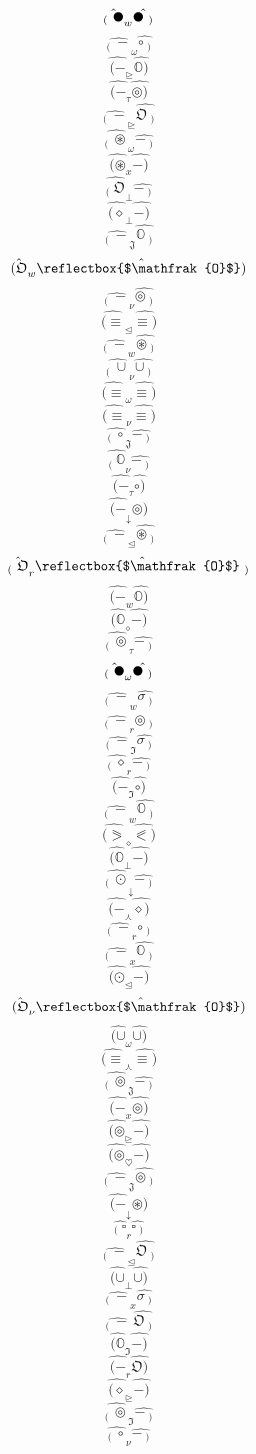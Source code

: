 \documentclass[12pt]{article}
\begin{document}
\begin{multicols}{5}
$$\hat{_( \ \newmoon} _w \hat{\newmoon\ _)}$$
$$\hat{_( \ -} _\omega \hat{\circ\ _)}$$
$$\hat{(-} _\trianglerighteq \hat{\mathbb{O})}$$
$$\hat{(-} _\tau \hat{\circledcirc)}$$
$$\hat{_( \ -} _\trianglerighteq \hat{\mathfrak{O}\ _)}$$
$$\hat{_( \ \circledast} _\omega \hat{-\ _)}$$
$$\hat{(\circledast} _x \hat{-)}$$
$$\hat{_( \ \mathfrak{O}} _\bot \hat{-\ _)}$$
$$\hat{(\diamond} _\bot \hat{-)}$$
$$\hat{_( \ -} _\mathfrak{J} \hat{\mathbb{O}\ _)}$$
$$\hat{(\mathfrak{O}} _w \hat{\reflectbox{$\mathfrak{O}$})}$$
$$\hat{_( \ -} _\nu \hat{\circledcirc\ _)}$$
$$\hat{(\equiv} _\trianglelefteq \hat{\equiv)}$$
$$\hat{_( \ -} _w \hat{\circledast\ _)}$$
$$\hat{_( \ \cup} _\nu \hat{\cup\ _)}$$
$$\hat{(\equiv} _\omega \hat{\equiv)}$$
$$\hat{(\equiv} _\nu \hat{\equiv)}$$
$$\hat{_( \ \circ} _\mathfrak{J} \hat{-\ _)}$$
$$\hat{_( \ \mathbb{O}} _\nu \hat{-\ _)}$$
$$\hat{(-} _\tau \hat{\circ)}$$
$$\hat{(-} _\downarrow \hat{\circledcirc)}$$
$$\hat{_( \ -} _\trianglelefteq \hat{\circledast\ _)}$$
$$\hat{_( \ \mathfrak{O}} _r \hat{\reflectbox{$\mathfrak{O}$}\ _)}$$
$$\hat{(-} _w \hat{\mathbb{O})}$$
$$\hat{(\mathbb{O}} _\diamond \hat{-)}$$
$$\hat{_( \ \circledcirc} _\tau \hat{-\ _)}$$
$$\hat{_( \ \newmoon} _\omega \hat{\newmoon\ _)}$$
$$\hat{_( \ -} _w \hat{\sigma\ _)}$$
$$\hat{_( \ -} _r \hat{\circledcirc\ _)}$$
$$\hat{_( \ -} _\mathfrak{I} \hat{\sigma\ _)}$$
$$\hat{_( \ \diamond} _r \hat{-\ _)}$$
$$\hat{(-} _\mathfrak{I} \hat{\circ)}$$
$$\hat{_( \ -} _w \hat{\mathbb{O}\ _)}$$
$$\hat{(\eqslantgtr} _\diamond \hat{\eqslantless)}$$
$$\hat{(\mathbb{O}} _\bot \hat{-)}$$
$$\hat{_( \ \odot} _\downarrow \hat{-\ _)}$$
$$\hat{(-} _\curlywedge \hat{\diamond)}$$
$$\hat{_( \ -} _r \hat{\circ\ _)}$$
$$\hat{_( \ -} _x \hat{\mathbb{O}\ _)}$$
$$\hat{(\odot} _\trianglelefteq \hat{-)}$$
$$\hat{(\mathfrak{O}} _\nu \hat{\reflectbox{$\mathfrak{O}$})}$$
$$\hat{(\cup} _\omega \hat{\cup)}$$
$$\hat{(\equiv} _\curlywedge \hat{\equiv)}$$
$$\hat{_( \ \circledcirc} _\mathfrak{J} \hat{-\ _)}$$
$$\hat{(-} _x \hat{\circledcirc)}$$
$$\hat{(\circledcirc} _\trianglerighteq \hat{-)}$$
$$\hat{(\circledcirc} _\heartsuit \hat{-)}$$
$$\hat{_( \ -} _\mathfrak{J} \hat{\circledcirc\ _)}$$
$$\hat{(-} _\downarrow \hat{\circledast)}$$
$$\hat{_( \ \square} _r \hat{\square\ _)}$$
$$\hat{_( \ -} _\trianglelefteq \hat{\mathfrak{O}\ _)}$$
$$\hat{(\cup} _\bot \hat{\cup)}$$
$$\hat{_( \ -} _x \hat{\sigma\ _)}$$
$$\hat{_( \ -} \  \hat{\mathfrak{O}\ _)}$$
$$\hat{(\mathbb{O}} _\mathfrak{I} \hat{-)}$$
$$\hat{(-} _r \hat{\mathfrak{O})}$$
$$\hat{(\diamond} _\trianglerighteq \hat{-)}$$
$$\hat{_( \ \circledcirc} _\mathfrak{I} \hat{-\ _)}$$
$$\hat{_( \ \circ} _\nu \hat{-\ _)}$$

\end{multicols}
\end{document}
